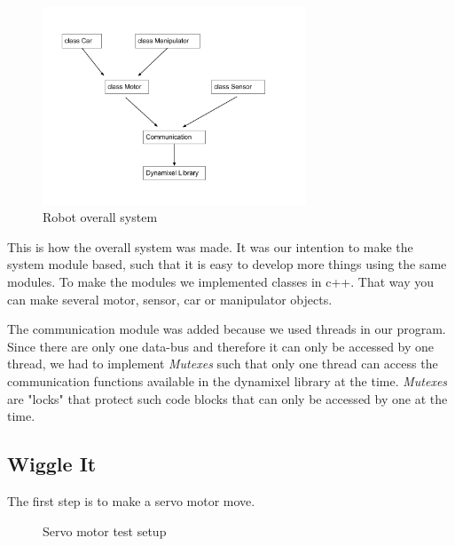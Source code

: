 \begin{figure}[H]
    \centering
    \includegraphics[width=0.7\textwidth]{graphics/Robot_class_diagram.png}	
    \caption{Robot overall system}
    \label{fig:Class_diagram}
\end{figure}

This is how the overall system was made. It was our intention to make the system module based, such that it is easy to develop more things using the same modules. To make the modules we implemented classes in c++. That way you can make several motor, sensor, car or manipulator objects. 

The communication module was added because we used threads in our program. Since there are only one data-bus and therefore it can only be accessed by one thread, we had to implement \textit{Mutexes} such that only one thread can access the communication functions available in the dynamixel library at the time. \textit{Mutexes} are "locks" that protect such code blocks that can only be accessed by one at the time.

\subsection{Wiggle It}

The first step is to make a servo motor move. 

\begin{figure}[H]
    \centering
    \caption{Servo motor test setup}
    \label{fig:servo} 
\end{figure}


